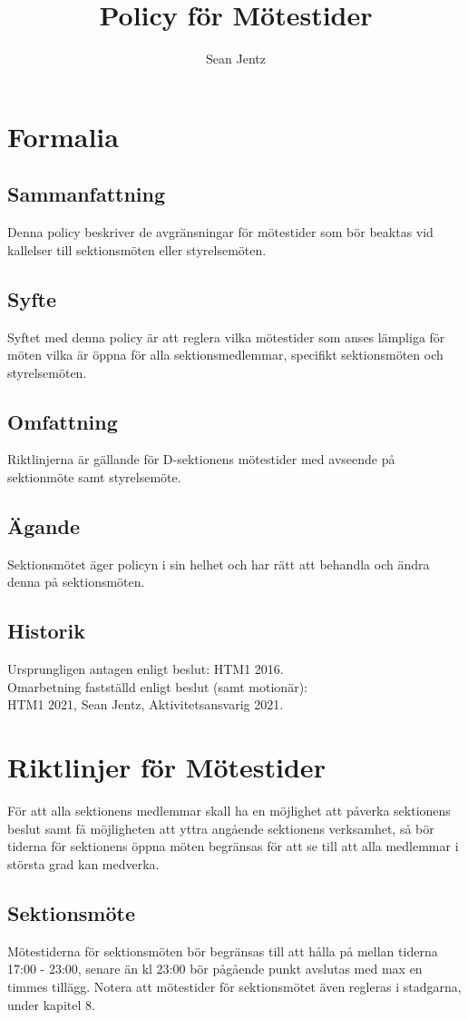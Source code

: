 \documentclass[]{dsekprotokoll}
\title{Policy för Mötestider}
\author{Sean Jentz}
\begin{document}
\section{Formalia}

\subsection{Sammanfattning}
Denna policy beskriver de avgränsningar för mötestider som bör beaktas vid kallelser till sektionsmöten eller styrelsemöten.

\subsection{Syfte}
Syftet med denna policy är att reglera vilka mötestider som anses lämpliga för möten vilka är öppna för alla sektionsmedlemmar, specifikt sektionsmöten och styrelsemöten.

\subsection{Omfattning}
Riktlinjerna är gällande för D-sektionens mötestider med avseende på sektionmöte samt styrelsemöte.

\subsection{Ägande}
Sektionsmötet äger policyn i sin helhet och har rätt att behandla och ändra denna på sektionsmöten.

\subsection{Historik}
Ursprungligen antagen enligt beslut: HTM1 2016. \\
Omarbetning fastställd enligt beslut (samt motionär): \\
HTM1 2021, Sean Jentz, Aktivitetsansvarig 2021.

\section{Riktlinjer för Mötestider}
För att alla sektionens medlemmar skall ha en möjlighet att påverka sektionens beslut samt få möjligheten att yttra angående sektionens verksamhet, så bör tiderna för sektionens öppna möten begränsas för att se till att alla medlemmar i största grad kan medverka.

\subsection{Sektionsmöte}
Mötestiderna för sektionsmöten bör begränsas till att hålla på mellan tiderna 17:00 -
23:00, senare än kl 23:00 bör pågående punkt avslutas med max en timmes tillägg.
Notera att mötestider för sektionsmötet även regleras i stadgarna, under kapitel 8.
\end{document}
